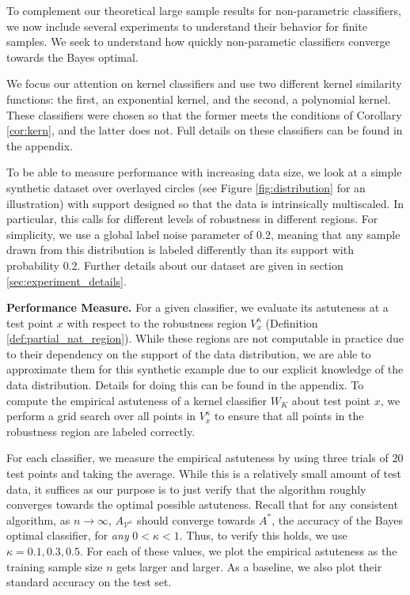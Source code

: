 To complement our theoretical large sample results for non-parametric classifiers, we now include several experiments to understand their behavior for finite samples. We seek to understand how quickly non-parametic classifiers converge towards the \natural\emph{ }Bayes optimal. 

We focus our attention on kernel classifiers and use two different kernel similarity functions: the first, an exponential kernel, and the second, a polynomial kernel.  These classifiers were chosen so that the former meets the conditions of Corollary \ref{cor:kern}, and the latter does not. Full details on these classifiers can be found in the appendix.

To be able to measure performance with increasing data size, we look at a simple synthetic dataset over overlayed circles (see Figure \ref{fig:distribution} for an illustration) with support designed so that the data is intrinsically multiscaled. In particular, this calls for different levels of robustness in different regions. For simplicity, we use a global label noise parameter of $0.2$, meaning that any sample drawn from this distribution is labeled differently than its support with probability $0.2$. Further details about our dataset are given in section \ref{sec:experiment_details}. 

\textbf{Performance Measure.} For a given classifier, we evaluate its astuteness at a test point $x$ with respect to the robustness region $V_x^{\kappa}$ (Definition \ref{def:partial_nat_region}). While these regions are not computable in practice due to their dependency on the  support of the data distribution, we are able to approximate them for this synthetic example due to our explicit knowledge of the data distribution. Details for doing this can be found in the appendix. To compute the empirical astuteness of a kernel classifier $W_K$ about test point $x$, we perform a grid search over all points in $V_x^{\kappa}$ to ensure that all points in the robustness region are labeled correctly.  

For each classifier, we measure the empirical astuteness by using three trials of $20$ test points and taking the average. While this is a relatively small amount of test data, it suffices as our purpose is to just verify that the algorithm roughly converges towards the optimal possible astuteness. Recall that for any \ncons\emph{ }consistent algorithm, as $n \to \infty$, $A_{\mathcal{V}^\kappa}$ should converge towards $A^*$, the accuracy of the Bayes optimal classifier, for \textit{any} $0 < \kappa < 1$. Thus, to verify this holds, we use $\kappa = 0.1, 0.3, 0.5$. For each of these values, we plot the empirical astuteness as the training sample size $n$ gets larger and larger. As a baseline, we also plot their standard accuracy on the test set. 

